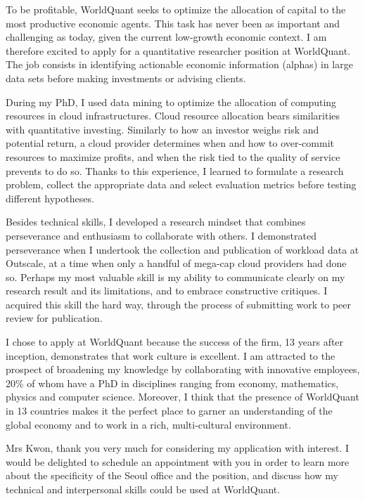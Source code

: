 To be profitable, WorldQuant seeks to optimize the allocation of capital to the most productive economic agents. 
This task has never been as important and challenging as today, given the current low-growth economic context.  
I am therefore excited to apply for a quantitative researcher position at WorldQuant. 
The job consists in identifying actionable economic information (alphas) in large data sets before making investments or advising clients.  

During my PhD, I used data mining to optimize the allocation of computing resources in cloud infrastructures. 
Cloud resource allocation bears similarities with quantitative investing.  
Similarly to how an investor weighs risk and potential return, a cloud provider determines when and how to over-commit resources to maximize profits, and when the risk tied to the quality of service prevents to do so. 
Thanks to this experience, I learned to formulate a research problem, collect the appropriate data and select evaluation metrics before testing different hypotheses. 

Besides technical skills, I developed a research mindset that combines perseverance and enthusiasm to collaborate with others. 
I demonstrated perseverance when I undertook the collection and publication of workload data at Outscale, at a time when only a handful of mega-cap cloud providers had done so. 
Perhaps my most valuable skill is my ability to communicate clearly on my research result and its limitations, and to embrace constructive critiques. 
I acquired this skill the hard way, through the process of submitting work to peer review for publication. 

I chose to apply at WorldQuant because the success of the firm, 13 years after inception, demonstrates that work culture is excellent. 
I am attracted to the prospect of broadening my knowledge by collaborating with innovative employees, 20\% of whom have a PhD in disciplines ranging from economy, mathematics, physics and computer science. 
Moreover, I think that the presence of WorldQuant in 13 countries makes it the perfect place to garner an understanding of the global economy and to work in a rich, multi-cultural environment. 

Mrs Kwon, thank you very much for considering my application with interest. 
I would be delighted to schedule an appointment with you in order to learn more about the specificity of the Seoul office and the position, and discuss how my technical and interpersonal skills could be used at WorldQuant. 
